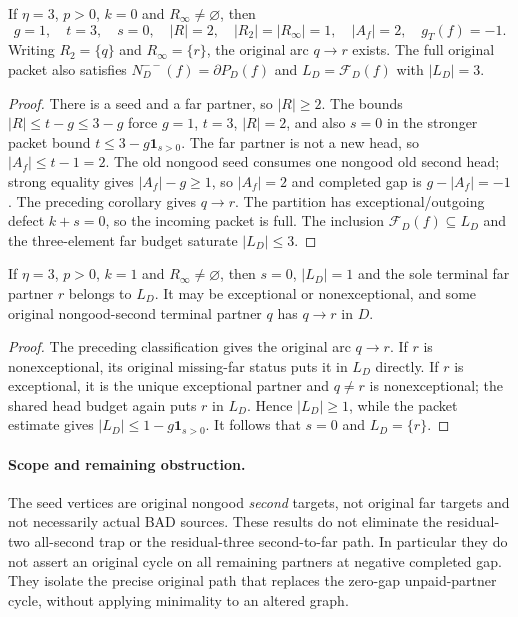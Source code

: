 \begin{corollary}
\label{cor:weak-equality-eta-three-nonexception-shape}
If $\eta=3$, $p>0$, $k=0$ and $R_\infty\ne\varnothing$, then
\[
 g=1,\quad t=3,\quad s=0,\quad |R|=2,\quad
 |R_2|=|R_\infty|=1,\quad |A_f|=2,\quad g_T(f)=-1.
\]
Writing $R_2=\{q\}$ and $R_\infty=\{r\}$, the original arc
$q\to r$ exists. The full original packet also satisfies
$N_D^{--}(f)=\partial P_D(f)$ and
$L_D=\mathcal F_D(f)$ with $|L_D|=3$.
\end{corollary}
\begin{proof}
There is a seed and a far partner, so $|R|\ge2$.
The bounds $|R|\le t-g\le3-g$ force $g=1$, $t=3$, $|R|=2$,
and also $s=0$ in the stronger packet bound $t\le3-g\mathbf1_{s>0}$.
The far partner is not a new head, so $|A_f|\le t-1=2$.
The old nongood seed consumes one nongood old second head; strong
equality gives $|A_f|-g\ge1$, so $|A_f|=2$ and completed gap is
$g-|A_f|=-1$. The preceding corollary gives $q\to r$.
The partition has exceptional/outgoing defect $k+s=0$, so the incoming
packet is full. The inclusion $\mathcal F_D(f)\subseteq L_D$ and
the three-element far budget saturate $|L_D|\le3$.
\end{proof}

\begin{corollary}
\label{cor:weak-equality-eta-three-one-exception-remainder}
If $\eta=3$, $p>0$, $k=1$ and $R_\infty\ne\varnothing$, then
$s=0$, $|L_D|=1$ and the sole terminal far partner $r$ belongs to
$L_D$. It may be exceptional or nonexceptional, and some original
nongood-second terminal partner $q$ has $q\to r$ in $D$.
\end{corollary}
\begin{proof}
The preceding classification gives the original arc $q\to r$.
If $r$ is nonexceptional, its original missing-far status puts it in
$L_D$ directly. If $r$ is exceptional, it is the unique exceptional
partner and $q\ne r$ is nonexceptional; the shared head budget again
puts $r$ in $L_D$. Hence $|L_D|\ge1$, while the packet estimate gives
$|L_D|\le1-g\mathbf1_{s>0}$. It follows that $s=0$ and
$L_D=\{r\}$.
\end{proof}

\paragraph{Scope and remaining obstruction.}
The seed vertices are original nongood \emph{second} targets, not
original far targets and not necessarily actual BAD sources. These
results do not eliminate the residual-two all-second trap or the
residual-three second-to-far path. In particular they do not assert
an original cycle on all remaining partners at negative completed gap.
They isolate the precise original path that replaces the zero-gap
unpaid-partner cycle, without applying minimality to an altered graph.

